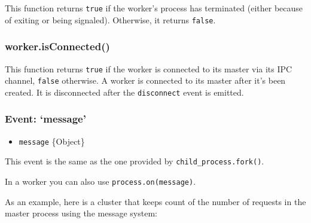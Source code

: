 This function returns \texttt{true} if the worker's process has
terminated (either because of exiting or being signaled). Otherwise, it
returns \texttt{false}.

\subsubsection{worker.isConnected()}\label{worker.isconnected}

This function returns \texttt{true} if the worker is connected to its
master via its IPC channel, \texttt{false} otherwise. A worker is
connected to its master after it's been created. It is disconnected
after the \texttt{disconnect} event is emitted.

\subsubsection{\texorpdfstring{Event:
`message'}{Event: message}}\label{event-message}

\begin{itemize}
\itemsep1pt\parskip0pt
\item
  \texttt{message} \{Object\}
\end{itemize}

This event is the same as the one provided by
\texttt{child\_process.fork()}.

In a worker you can also use
\texttt{process.on(\textquotesingle{}message\textquotesingle{})}.

As an example, here is a cluster that keeps count of the number of
requests in the master process using the message system:

